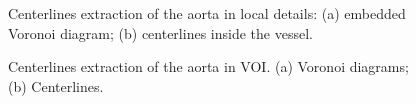 \begin{figure}[t]
\centering
{}
\hfil
{}
\caption{Centerlines extraction of the aorta in local details: (a) embedded Voronoi diagram; (b) centerlines inside the vessel.}%
\label{fig:CenterlinesLocal}
\end{figure}

\begin{figure}[t]
\centering
{}
\hfil
{}
\caption{Centerlines extraction of the aorta in VOI. (a) Voronoi diagrams; (b) Centerlines. }
\label{fig:CenterlineGlobal}
\end{figure}

